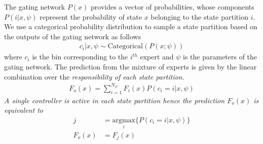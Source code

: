The gating network $P(x)$ provides a vector of probabilities, whose
components $P(i | x, \psi)$ represent the probability of state $x$ belonging to
the state partition $i$.
%
We use a categorical probability distribution to sample a state partition based
on the outputs of the gating network as follows~\cite{harkonen2022mixtures} 
\begin{align}
  c_i | x, \psi \sim \text{Categorical}(P(x; \psi)) 
  \label{eq:gating_categorical}
\end{align}
\noindent where $c_i$ is the bin corresponding to the $i^{th}$ expert and $\psi$
is the parameters of the gating network.
%
The prediction from the mixture of experts is given by the linear combination over
the \it{responsibility} \normalfont of each state partition.
%
\begin{align*}
  F_o(x) = \sum_{i=1}^{N_F}F_i(x)P(c_i=i | x, \psi)
\end{align*}
A single controller is active in each state partition hence the prediction $F_o(x)$ is equivalent to 
\begin{align*}
  j &= \underset{i}{\textrm{argmax}} \{ P(c_i=i | x, \psi) \}\\
  F_o(x) &= F_j(x)
\end{align*}



